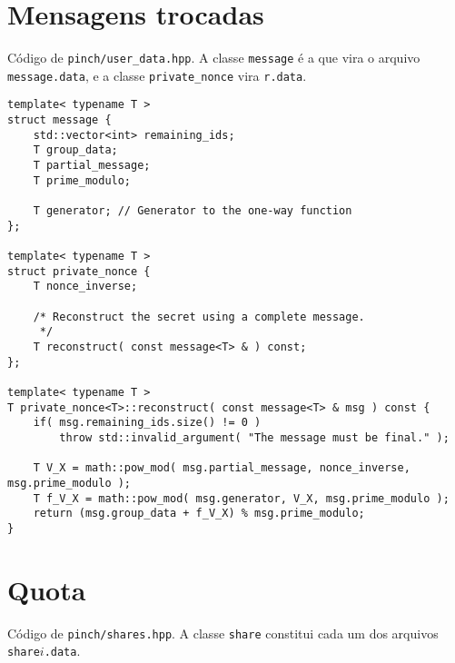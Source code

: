 \documentclass[10pt]{article}
\begin{document}
\section{Mensagens trocadas}

Código de \verb"pinch/user_data.hpp".
A classe \verb"message" é a que vira o arquivo \verb"message.data",
e a classe \verb"private_nonce" vira \verb"r.data".

\begin{verbatim}
template< typename T >
struct message {
    std::vector<int> remaining_ids;
    T group_data;
    T partial_message;
    T prime_modulo;

    T generator; // Generator to the one-way function
};

template< typename T >
struct private_nonce {
    T nonce_inverse;

    /* Reconstruct the secret using a complete message.
     */
    T reconstruct( const message<T> & ) const;
};

template< typename T >
T private_nonce<T>::reconstruct( const message<T> & msg ) const {
    if( msg.remaining_ids.size() != 0 )
        throw std::invalid_argument( "The message must be final." );

    T V_X = math::pow_mod( msg.partial_message, nonce_inverse, msg.prime_modulo );
    T f_V_X = math::pow_mod( msg.generator, V_X, msg.prime_modulo );
    return (msg.group_data + f_V_X) % msg.prime_modulo;
}
\end{verbatim}

\section{Quota}

Código de \verb"pinch/shares.hpp".
A classe \verb"share" constitui cada um dos arquivos \verb"share"$i$\verb".data".
\end{document}
